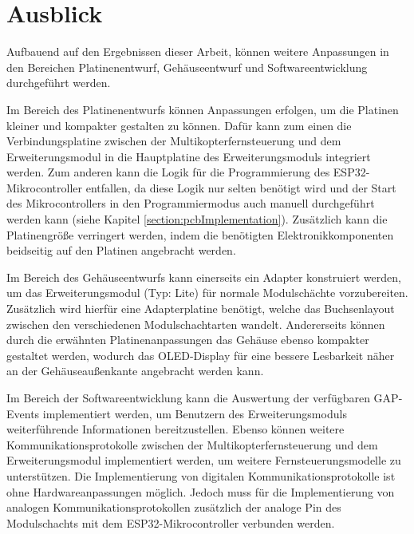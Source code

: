 \section{Ausblick}
Aufbauend auf den Ergebnissen dieser Arbeit, können weitere Anpassungen in den Bereichen Platinenentwurf, Gehäuseentwurf und Softwareentwicklung durchgeführt werden.

Im Bereich des Platinenentwurfs können Anpassungen erfolgen, um die Platinen kleiner und kompakter gestalten zu können. Dafür kann zum einen die Verbindungsplatine zwischen der Multikopterfernsteuerung und dem Erweiterungsmodul in die Hauptplatine des Erweiterungsmoduls integriert werden. Zum anderen kann die Logik für die Programmierung des ESP32-Mikrocontroller entfallen, da diese Logik nur selten benötigt wird und der Start des Mikrocontrollers in den Programmiermodus auch manuell durchgeführt werden kann (siehe Kapitel \ref{section:pcbImplementation}). Zusätzlich kann die Platinengröße verringert werden, indem die benötigten Elektronikkomponenten beidseitig auf den Platinen angebracht werden.

Im Bereich des Gehäuseentwurfs kann einerseits ein Adapter konstruiert werden, um das Erweiterungsmodul (Typ: Lite) für normale Modulschächte vorzubereiten. Zusätzlich wird hierfür eine Adapterplatine benötigt, welche das Buchsenlayout zwischen den verschiedenen Modulschachtarten wandelt. Andererseits können durch die erwähnten Platinenanpassungen das Gehäuse ebenso kompakter gestaltet werden, wodurch das \acs{OLED}-Display für eine bessere Lesbarkeit näher an der Gehäuseaußenkante angebracht werden kann.

Im Bereich der Softwareentwicklung kann die Auswertung der verfügbaren \ac{GAP}-Events implementiert werden, um Benutzern des Erweiterungsmoduls weiterführende Informationen bereitzustellen. Ebenso können weitere Kommunikationsprotokolle zwischen der Multikopterfernsteuerung und dem Erweiterungsmodul implementiert werden, um weitere Fernsteuerungsmodelle zu unterstützen. Die Implementierung von digitalen Kommunikationsprotokolle ist ohne Hardwareanpassungen möglich. Jedoch muss für die Implementierung von analogen Kommunikationsprotokollen zusätzlich der analoge Pin des Modulschachts mit dem ESP32-Mikrocontroller verbunden werden.